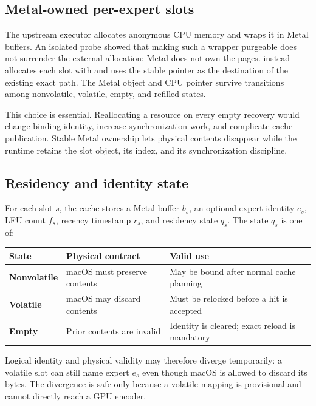 \FloatBarrier

\subsection{Metal-owned per-expert slots}

The upstream executor allocates anonymous CPU memory and wraps it in
 Metal buffers. An isolated probe showed that making such a
wrapper purgeable does not surrender the external allocation: Metal does not
own the pages. \system instead allocates each slot with
 and uses the stable
 pointer as the destination of the existing exact
 path. The Metal object and CPU pointer survive transitions among
nonvolatile, volatile, empty, and refilled states.

This choice is essential. Reallocating a resource on every empty recovery would
change binding identity, increase synchronization work, and complicate cache
publication. Stable Metal ownership lets physical contents disappear while the
runtime retains the slot object, its index, and its synchronization discipline.

\subsection{Residency and identity state}

For each slot $s$, the cache stores a Metal buffer $b_s$, an optional expert
identity $e_s$, LFU count $f_s$, recency timestamp $r_s$, and residency state
$q_s$. The state $q_s$ is one of:

\begin{center}
\begin{tabularx}{0.96\linewidth}{>{\bfseries}l X X}
\toprule
State & Physical contract & Valid use \\
\midrule
Nonvolatile & macOS must preserve contents & May be bound after normal cache planning \\
Volatile & macOS may discard contents & Must be relocked before a hit is accepted \\
Empty & Prior contents are invalid & Identity is cleared; exact reload is mandatory \\
\bottomrule
\end{tabularx}
\end{center}

Logical identity and physical validity may therefore diverge temporarily: a
volatile slot can still name expert $e_s$ even though macOS is allowed to
discard its bytes. The divergence is safe only because a volatile mapping is
provisional and cannot directly reach a GPU encoder.

